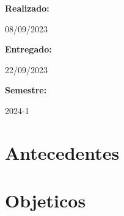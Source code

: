 \documentclass[a4paper]{article}
\begin{document}
\begin{titlepage}
        \raggedright{\huge\textbf{Realizado:}}
        \par\vspace{0.5cm}
        \centering
        {\huge{08/09/2023}}
        \par\vspace{0.5cm}

        \raggedright{\huge\textbf{Entregado:}}
        \par\vspace{0.5cm}
        \centering
        {\huge{22/09/2023}}
        \par\vspace{0.5cm}

        \raggedright{\huge\textbf{Semestre:}}
        \par\vspace{0.5cm}
        \centering
        {\huge{2024-1}}
        \par\vspace{0.5cm}

        \vfill

    \end{titlepage}
    \clearpage

    \tableofcontents
    \cfoot{\thepage}
    \clearpage
    \section{Antecedentes}
    \section{Objeticos}
    
\end{document}
